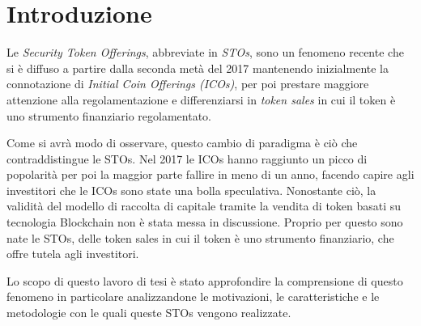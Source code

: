 \chapter*{Introduzione}                 %

Le \textit{Security Token Offerings}, abbreviate in \textit{STOs}, sono un fenomeno recente che si è diffuso a partire dalla seconda metà del 2017 mantenendo inizialmente la connotazione di \textit{Initial Coin Offerings (ICOs)}, per poi prestare maggiore attenzione alla regolamentazione e differenziarsi in \textit{token sales} in cui il token è uno strumento finanziario regolamentato. 

Come si avrà modo di osservare, questo cambio di paradigma è ciò che contraddistingue le STOs. Nel 2017 le ICOs hanno raggiunto un picco di popolarità per poi la maggior parte fallire in meno di un anno, facendo capire agli investitori che le ICOs sono state una bolla speculativa. Nonostante ciò, la validità del modello di raccolta di capitale tramite la vendita di token basati su tecnologia Blockchain non è stata messa in discussione. Proprio per questo sono nate le STOs, delle token sales in cui il token è uno strumento finanziario, che offre tutela agli investitori. 

Lo scopo di questo lavoro di tesi è stato approfondire la comprensione di questo fenomeno in particolare analizzandone le motivazioni, le caratteristiche e le metodologie con le quali queste STOs vengono realizzate.

